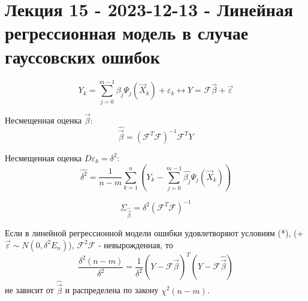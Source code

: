 \section{Лекция 15 - 2023-12-13 - Линейная регрессионная модель в случае гауссовских ошибок}

\[
  Y_k = \sum_{j=0}^{m-1} \beta_j \Psi_j( \vec{X}_k ) + \varepsilon_k
  \leftrightarrow
  Y = \mathcal{F} \vec{\beta} + \vec{\varepsilon}
\]

Несмещенная оценка $\vec{\beta}$:
\[
  \hat{\vec{\beta}} = (\mathcal{F}^T \mathcal{F})^{-1} \mathcal{F}^T Y
\]

Несмещенная оценка $D\varepsilon_k = \delta^2$:
\[
  \hat{\delta^2} = \frac{1}{n-m} \sum_{k=1}^n (Y_k - \sum_{j=0}^{m-1} \hat{\beta_j} \Psi_j(\vec{X}_k))
\]

\[
  \Sigma_{\hat{\vec{\beta}}} = \delta^2 (\mathcal{F}^T \mathcal{F})^{-1}
\]

\begin{theorem}
  Если в линейной регрессионной модели ошибки удовлетворяют условиям (*), 
  (+ $\vec{\varepsilon} \sim N(0, \delta^2 E_n)$), $\mathcal{F}^2 \mathcal{F}$ - невырожденная, 
  то 
  \[
    \frac{\delta^2 (n-m)}{\delta^2} =
    \frac{1}{\delta^2} (Y - \mathcal{F} \hat{\vec{\beta}})^T (Y - \mathcal{F} \hat{\vec{\beta}})
  \]
  не зависит от $\hat{\vec{\beta}}$ и распределена по закону $\chi^2(n-m)$.
\end{theorem}

